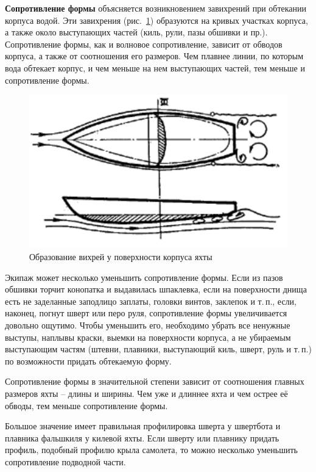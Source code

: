 \documentclass[a4paper, 12pt, twoside, final]{scrbook}
\begin{document}
\textbf{Сопротивление формы} объясняется возникновением завихрений при обтекании корпуса водой. Эти завихрения (рис.~\ref{fig:84}) образуются на кривых участках корпуса, а также около выступающих частей (киль, рули, пазы обшивки и пр.). Сопротивление формы, как и волновое сопротивление, зависит от обводов корпуса, а также от соотношения его размеров. Чем плавнее линии, по которым вода обтекает корпус, и чем меньше на нем выступающих частей, тем меньше и сопротивление формы.

\begin{figure}
   \centering
   \includegraphics{pics/84_Obrazovanie_vihrej} %
   \caption{Образование вихрей у поверхности корпуса яхты}
   \label{fig:84}
\end{figure}

Экипаж может несколько уменьшить сопротивление формы. Если из пазов обшивки торчит конопатка и выдавилась шпаклевка, если на поверхности днища есть не заделанные заподлицо заплаты, головки винтов, заклепок и т.\,п., если, наконец, погнут шверт или перо руля, сопротивление формы увеличивается довольно ощутимо. Чтобы уменьшить его, необходимо убрать все ненужные выступы, наплывы краски, выемки на поверхности корпуса, а не убираемым выступающим частям (штевни, плавники, выступающий киль, шверт, руль и т.\,п.) по возможности придать обтекаемую форму.

Сопротивление формы в значительной степени зависит от соотношения главных размеров яхты \--- длины и ширины. Чем уже и длиннее яхта и чем острее её обводы, тем меньше сопротивление формы.

Большое значение имеет правильная профилировка шверта у швертбота и плавника фальшкиля у килевой яхты. Если шверту или плавнику придать профиль, подобный профилю крыла самолета, то можно несколько уменьшить сопротивление подводной части.{\sloppy\par}
\end{document}
